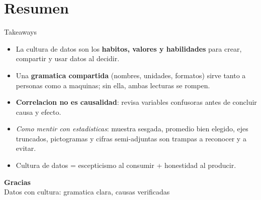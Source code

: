 \documentclass[aspectratio=169]{beamer}
\begin{document}
\section{Resumen}

\begin{frame}{Takeaways}
  \begin{itemize}
    \item La cultura de datos son los \textbf{habitos, valores y habilidades}
          para crear, compartir y usar datos al decidir.
    \item Una \textbf{gramatica compartida} (nombres, unidades, formatos)
          sirve tanto a personas como a maquinas; sin ella, ambas lecturas se
          rompen.
    \item \textbf{Correlacion no es causalidad}: revisa variables confusoras
          antes de concluir causa y efecto.
    \item \emph{Como mentir con estadisticas}: muestra sesgada, promedio bien
          elegido, ejes truncados, pictogramas y cifras semi-adjuntas son
          trampas a reconocer y a evitar.
    \item Cultura de datos = escepticismo al consumir + honestidad al
          producir.
  \end{itemize}
\end{frame}

\begin{frame}[plain]
  \molinaBanner
  \vfill
  \begin{center}
    {\color{molMorado}\Large\bfseries Gracias}\\[0.4em]
    {\color{molTeal} Datos con cultura: gramatica clara, causas verificadas}
  \end{center}
  \vfill\vspace{1.0cm}
  \molinaLogos
\end{frame}
\end{document}
